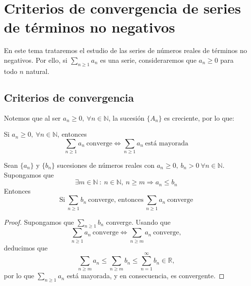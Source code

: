 \chapter{Criterios de convergencia de series de términos no negativos}\label{chp:Tema10}

En este tema trataremos el estudio de las series de números reales de términos no negativos. Por ello, si $\displaystyle\sum_{n \geq 1} a_n$ es una serie, consideraremos que $a_n \geq 0$ para todo $n$ natural.


\section{Criterios de convergencia}
Notemos que al ser $a_n \geq 0, ~ \forall n \in \mathbb{N}$, la sucesión $\{A_n\}$ es creciente, por lo que:
\begin{prop}
    Si $a_n \geq 0, ~ \forall n \in \mathbb{N}$, entonces
    \begin{equation*}
        \displaystyle\sum_{n \geq 1} a_n ~ \text{converge} \Longleftrightarrow  \displaystyle\sum_{n \geq 1} a_n ~ \text{está mayorada}
    \end{equation*}
\end{prop}

\begin{prop}
    Sean $\{a_n\}$ y $\{b_n\}$ sucesiones de números reales con $a_n \geq 0,~b_n > 0 ~ \forall n \in \mathbb{N}$.
    Supongamos que
    \begin{equation*}
        \exists m \in \mathbb{N} ~:~ n \in \mathbb{N}, ~ n \geq m \Longrightarrow a_n \leq b_n
    \end{equation*}
    Entonces
    \begin{equation*}
        \text{Si} ~\displaystyle\sum_{n \geq 1} b_n ~ \text{converge, entonces} ~ \displaystyle\sum_{n \geq 1} a_n ~ \text{converge}
    \end{equation*}
\end{prop}
\begin{proof}
    Supongamos que $\displaystyle\sum_{n \geq 1} b_n$ converge. Usando que
    \begin{equation*}
        \displaystyle\sum_{n \geq 1} a_n ~ \text{converge} \Longleftrightarrow \displaystyle\sum_{n \geq m} a_n ~ \text{converge},
    \end{equation*}
    deducimos que
    \begin{equation*}
        \displaystyle\sum_{n \geq m} a_n \leq \displaystyle\sum_{n \geq m} b_n \leq \displaystyle\sum_{n = 1}^{\infty} b_n \in \mathbb{R},
    \end{equation*}
    por lo que $\displaystyle\sum_{n \geq 1} a_n$ está mayorada, y en consecuencia, es convergente.
\end{proof}

